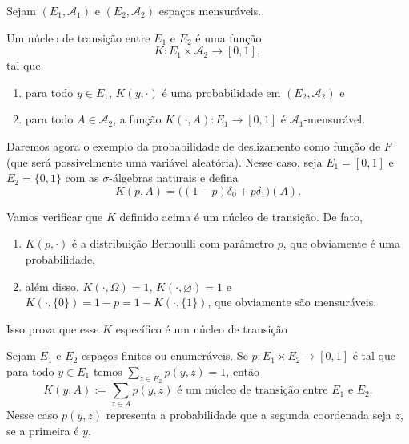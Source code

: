 Sejam $(E_1, \mathcal{A}_1)$ e $(E_2, \mathcal{A}_2)$ espaços mensuráveis.
\begin{definition}
  Um núcleo de transição entre $E_1$ e $E_2$ é uma função 
  \begin{equation}
    K: E_1 \times \mathcal{A}_2 \to [0,1],
  \end{equation}
  tal que
  \begin{enumerate}[\quad a)]
  \item para todo $y \in E_1$, $K(y,\cdot)$ é uma probabilidade em $(E_2, \mathcal{A}_2)$ e
  \item para todo $A \in \mathcal{A}_2$, a função $K(\cdot, A): E_1 \to [0,1]$ é $\mathcal{A}_1$-mensurável.
  \end{enumerate}
\end{definition}

\begin{example}
  \label{x:chance_deslizamento}
  Daremos agora o exemplo da probabilidade de deslizamento como função de $F$ (que será possivelmente uma variável aleatória).
  Nesse caso, seja $E_1 = [0,1]$ e $E_2 = \{0,1\}$ com as $\sigma$-álgebras naturais e defina
  \begin{equation}
    K(p, A) = \big( (1-p)\delta_0 + p \delta_1 \big) (A).
  \end{equation}
\end{example}

Vamos verificar que $K$ definido acima é um núcleo de transição.
De fato,
\begin{enumerate}[\quad i)]
\item $K(p, \cdot)$ é a distribuição Bernoulli com parâmetro $p$, que obviamente é uma probabilidade,
\item além disso, $K(\cdot, \Omega) = 1$, $K(\cdot, \varnothing) = 1$ e $K(\cdot, \{0\}) = 1-p = 1 - K(\cdot,\{1\})$, que obviamente são mensuráveis.
\end{enumerate}

Isso prova que esse $K$ específico é um núcleo de transição

\begin{example}
  \label{x:nucleo_discreto}
  Sejam $E_1$ e $E_2$ espaços finitos ou enumeráveis.
  Se $p: E_1 \times E_2 \to [0,1]$ é tal que para todo $y \in E_1$ temos $\sum_{z\in E_2} p(y, z) = 1$, então
  \begin{equation}
    K(y, A) := \sum_{z \in A} p(y, z) \text{ é um núcleo de transição entre $E_1$ e $E_2$.}
  \end{equation}
  Nesse caso $p(y,z)$ representa a probabilidade que a segunda coordenada seja $z$, se a primeira é $y$.
\end{example}


